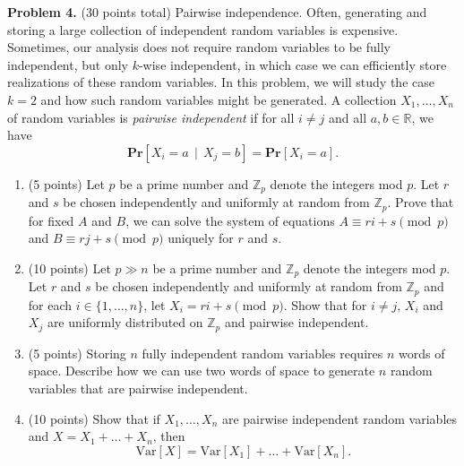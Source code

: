 \documentclass[11pt]{article}
\newcommand{\Var}[1]{\ensuremath{\text{Var}\left[#1\right]}}
\newcommand{\PPr}[1]{\ensuremath{\mathbf{Pr}\left[#1\right]}}
\begin{document}
\vskip 0.2in\noindent
\noindent
\textbf{Problem 4.} (30 points total)
Pairwise independence.
\vskip 0.1in\noindent
Often, generating and storing a large collection of independent random variables is expensive. Sometimes, our analysis does not require random variables to be fully independent, but only $k$-wise independent, in which case we can efficiently store realizations of these random variables. In this problem, we will study the case $k=2$ and how such random variables might be generated.
\vskip 0.1in\noindent
A collection $X_1,\ldots,X_n$ of random variables is \emph{pairwise independent} if for all $i\neq j$ and all $a,b\in\mathbb{R}$, we have
\[\PPr{X_i=a\,\mid\,X_j=b}=\PPr{X_i=a}.\]
\begin{enumerate}
\item (5 points)
Let $p$ be a prime number and $\mathbb{Z}_p$ denote the integers mod $p$. 
Let $r$ and $s$ be chosen independently and uniformly at random from $\mathbb{Z}_p$.  
Prove that for fixed $A$ and $B$, we can solve the system of equations $A\equiv ri+s\pmod{p}$ and $B\equiv rj+s\pmod{p}$ uniquely for $r$ and $s$. 
\item (10 points)
Let $p\gg n$ be a prime number and $\mathbb{Z}_p$ denote the integers mod $p$. 
Let $r$ and $s$ be chosen independently and uniformly at random from $\mathbb{Z}_p$ and for each $i\in\{1,\ldots,n\}$, let $X_i=ri+s\pmod{p}$. 
Show that for $i\neq j$, $X_i$ and $X_j$ are uniformly distributed on $\mathbb{Z}_p$ and pairwise independent. 
\item (5 points)
Storing $n$ fully independent random variables requires $n$ words of space. Describe how we can use two words of space to generate $n$ random variables that are pairwise independent. 
\item (10 points)
Show that if $X_1,\ldots,X_n$ are pairwise independent random variables and $X=X_1+\ldots+X_n$, then
\[\Var{X}=\Var{X_1}+\ldots+\Var{X_n}.\]
\end{enumerate}
\end{document}
